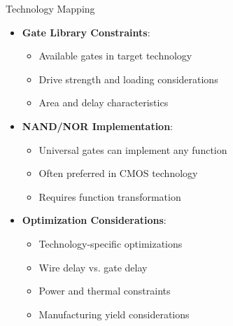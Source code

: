 \documentclass[aspectratio=169,11pt]{beamer}
\newcommand{\concept}[1]{\textbf{\color{accentcolor}#1}}
\begin{document}
\begin{frame}{Technology Mapping}
\begin{itemize}
\item \concept{Gate Library Constraints}:
\begin{itemize}
\item Available gates in target technology
\item Drive strength and loading considerations
\item Area and delay characteristics
\end{itemize}
\vspace{0.5cm}
\item \concept{NAND/NOR Implementation}:
\begin{itemize}
\item Universal gates can implement any function
\item Often preferred in CMOS technology
\item Requires function transformation
\end{itemize}
\vspace{0.5cm}
\item \concept{Optimization Considerations}:
\begin{itemize}
\item Technology-specific optimizations
\item Wire delay vs. gate delay
\item Power and thermal constraints
\item Manufacturing yield considerations
\end{itemize}
\end{itemize}
\end{frame}
\end{document}
